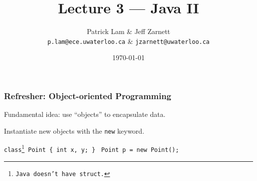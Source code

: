 

\usepackage{alltt}

\title{Lecture 3 --- Java II}

\author{Patrick Lam \& Jeff Zarnett \\ \small \texttt{p.lam@ece.uwaterloo.ca} \& \texttt{jzarnett@uwaterloo.ca}}
\date{\today}





\begin{frame}
  \titlepage
\end{frame}

\begin{frame}
\frametitle{Refresher: Object-oriented Programming}

\large
\begin{changemargin}{1.5cm}
Fundamental idea: use ``objects'' to encapsulate data.\vfill

Instantiate new objects with the \texttt{new} keyword.

{\tt class\footnote{Java doesn't have {\tt struct}.} Point \{ int x, y; \} }\vfill
{\tt Point p = new Point(); }
\end{changemargin}

\end{frame}

